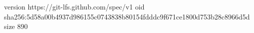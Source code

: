 version https://git-lfs.github.com/spec/v1
oid sha256:5d58a00b4937d986155c0743838b80154fdddc9f671ce1800d753b28c8966d5d
size 890
